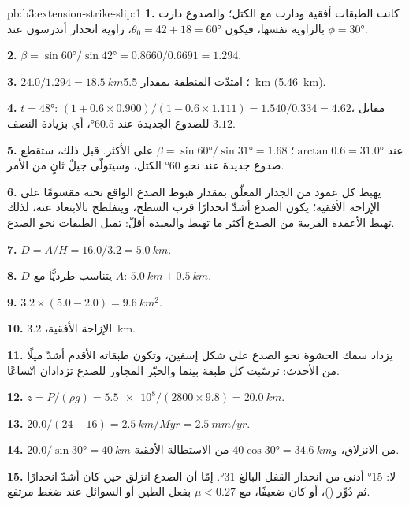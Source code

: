 \begin{solution}{pb:b3:extension-strike-slip:1}
\textbf{1.} كانت الطبقات أفقية ودارت مع الكتل؛
والصدوع دارت بالزاوية نفسها، فيكون $\theta_0 = 42 + 18 = \ang{60}$،
زاوية انحدار أندرسون عند $\phi = \ang{30}$.

\textbf{2.} $\beta = \sin\ang{60}/\sin\ang{42} = 0.8660/0.6691 = 1.294$.

\textbf{3.} $24.0/1.294 = \qty{18.5}{km}$؛ امتدّت المنطقة بمقدار
\qty{5.5}{km} (\qty{5.46}{km}).

\textbf{4.} $t = \ang{48}$: $(1 + 0.6\times0.900)/(1 - 0.6\times1.111) =
1.540/0.334 = 4.62$، مقابل $3.12$ للصدوع الجديدة عند \ang{60.5}، أي
بزيادة النصف.

\textbf{5.} عند $\arctan0.6 = \ang{31.0}$؛ $\beta = \sin\ang{60}/\sin\ang{31}
= 1.68$ على الأكثر. قبل ذلك، ستقطع صدوع جديدة عند نحو \ang{60} الكتل،
وسيتولّى جيلٌ ثانٍ من  الأمر.

\textbf{6.} يهبط كل عمود من الجدار المعلّق بمقدار هبوط الصدع الواقع
تحته مقسومًا على الإزاحة الأفقية؛ يكون الصدع أشدّ انحدارًا قرب السطح،
ويتفلطح بالابتعاد عنه، لذلك تهبط الأعمدة القريبة من الصدع أكثر ما تهبط والبعيدة
أقلّ: تميل الطبقات نحو الصدع.

\textbf{7.} $D = A/H = 16.0/3.2 = \qty{5.0}{km}$.

\textbf{8.} $D$ يتناسب طرديًّا مع $A$: $\qty{5.0}{km} \pm \qty{0.5}{km}$.

\textbf{9.} $3.2\times(5.0 - 2.0) = \qty{9.6}{km^2}$.

\textbf{10.} الإزاحة الأفقية، \qty{3.2}{km}.

\textbf{11.} يزداد سمك الحشوة نحو الصدع على شكل إسفين، وتكون طبقاته الأقدم
أشدّ ميلًا من الأحدث: ترسّبت كل طبقة بينما
 والحيّز المجاور للصدع تزدادان اتّساعًا.

\textbf{12.} $z = P/(\rho g) = \num{5.5e8}/(2800\times9.8) = \qty{20.0}{km}$.

\textbf{13.} $20.0/(24 - 16) = \qty{2.5}{km/Myr} = \qty{2.5}{mm/yr}$.

\textbf{14.} $20.0/\sin\ang{30} = \qty{40}{km}$ من الانزلاق، و$40\cos\ang{30} =
\qty{34.6}{km}$ من الاستطالة الأفقية.

\textbf{15.} لا: \ang{15} أدنى من انحدار القفل البالغ \ang{31}. إمّا أن الصدع
انزلق حين كان أشدّ انحدارًا ثم دُوِّر ()، أو
كان ضعيفًا، مع $\mu < 0.27$ بفعل الطين أو السوائل عند ضغط مرتفع.


\end{solution}
